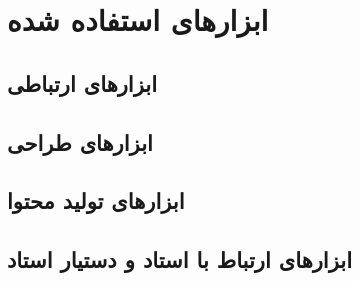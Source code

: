 \documentclass[12pt,svgnames,oneside]{book}
\begin{document}
\section{ابزار‌های استفاده شده}
\subsection{ابزار‌های ارتباطی}
\subsection{ابزار‌های طراحی}
\subsection{ابزار‌های تولید محتوا}
\subsection{ابزار‌های ارتباط با استاد و دستیار استاد}




\end{document}
